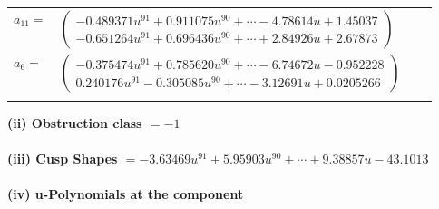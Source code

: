 \documentclass[1p]{elsarticle_modified}
\theoremstyle{definition}
\begin{document}
\begin{tabular}{m{7pt} m{180pt} m{7pt} m{180pt} }
\flushright $a_{11}=$&$\begin{pmatrix}-0.489371 u^{91}+0.911075 u^{90}+\cdots-4.78614 u+1.45037\\-0.651264 u^{91}+0.696436 u^{90}+\cdots+2.84926 u+2.67873\end{pmatrix}$ \\
\flushright $a_{6}=$&$\begin{pmatrix}-0.375474 u^{91}+0.785620 u^{90}+\cdots-6.74672 u-0.952228\\0.240176 u^{91}-0.305085 u^{90}+\cdots-3.12691 u+0.0205266\end{pmatrix}$\\&\end{tabular}
\flushleft \textbf{(ii) Obstruction class $= -1$}\\~\\
\flushleft \textbf{(iii) Cusp Shapes $= -3.63469 u^{91}+5.95903 u^{90}+\cdots+9.38857 u-43.1013$}\\~\\
\newpage\renewcommand{\arraystretch}{1}
\flushleft \textbf{(iv) u-Polynomials at the component}\newline \\
\end{document}
